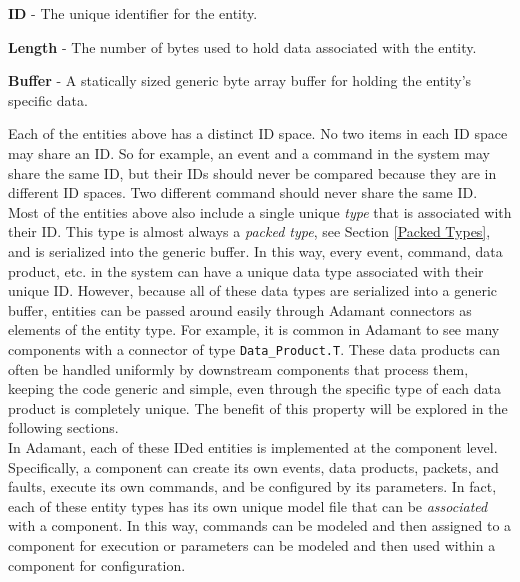 \vspace{5mm} %
\begin{spaceditemize}
  \item \textbf{ID} - The unique identifier for the entity.
  \item \textbf{Length} - The number of bytes used to hold data associated with the entity.
  \item \textbf{Buffer} - A statically sized generic byte array buffer for holding the entity's specific data.
\end{spaceditemize}
\vspace{5mm} %

Each of the entities above has a distinct ID space. No two items in each ID space may share an ID. So for example, an event and a command in the system may share the same ID, but their IDs should never be compared because they are in different ID spaces. Two different command should never share the same ID. \\

Most of the entities above also include a single unique \textit{type} that is associated with their ID. This type is almost always a \textit{packed type}, see Section \ref{Packed Types}, and is serialized into the generic buffer. In this way, every event, command, data product, etc. in the system can have a unique data type associated with their unique ID. However, because all of these data types are serialized into a generic buffer, entities can be passed around easily through Adamant connectors as elements of the entity type. For example, it is common in Adamant to see many components with a connector of type \texttt{Data\_Product.T}. These data products can often be handled uniformly by downstream components that process them, keeping the code generic and simple, even through the specific type of each data product is completely unique. The benefit of this property will be explored in the following sections. \\

In Adamant, each of these IDed entities is implemented at the component level. Specifically, a component can create its own events, data products, packets, and faults, execute its own commands, and be configured by its parameters. In fact, each of these entity types has its own unique model file that can be \textit{associated} with a component. In this way, commands can be modeled and then assigned to a component for execution or parameters can be modeled and then used within a component for configuration. \\

